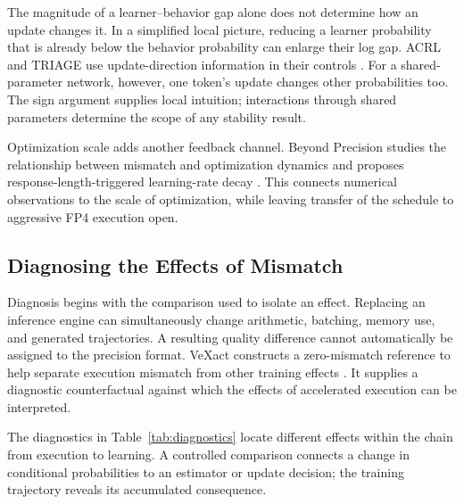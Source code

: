 The magnitude of a learner--behavior gap alone does not determine how an update changes it. In a simplified local picture, reducing a learner probability that is already below the behavior probability can enlarge their log gap. ACRL and TRIAGE use update-direction information in their controls \citep{acrl,triage}. For a shared-parameter network, however, one token's update changes other probabilities too. The sign argument supplies local intuition; interactions through shared parameters determine the scope of any stability result.

Optimization scale adds another feedback channel. Beyond Precision studies the relationship between mismatch and optimization dynamics and proposes response-length-triggered learning-rate decay \citep{beyond}. This connects numerical observations to the scale of optimization, while leaving transfer of the schedule to aggressive FP4 execution open.

\subsection{Diagnosing the Effects of Mismatch}
Diagnosis begins with the comparison used to isolate an effect. Replacing an inference engine can simultaneously change arithmetic, batching, memory use, and generated trajectories. A resulting quality difference cannot automatically be assigned to the precision format. VeXact constructs a zero-mismatch reference to help separate execution mismatch from other training effects \citep{vexact}. It supplies a diagnostic counterfactual against which the effects of accelerated execution can be interpreted.

The diagnostics in Table~\ref{tab:diagnostics} locate different effects within the chain from execution to learning. A controlled comparison connects a change in conditional probabilities to an estimator or update decision; the training trajectory reveals its accumulated consequence.



